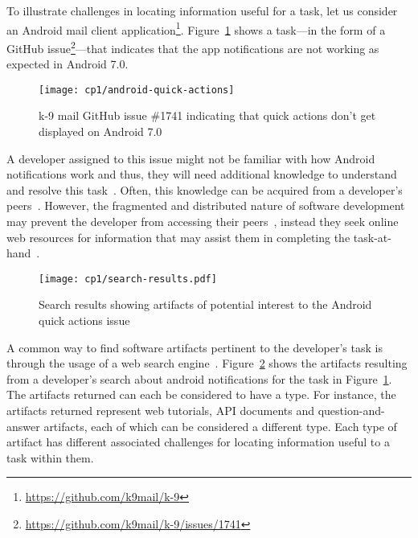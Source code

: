  
 
 To illustrate challenges in locating information useful for a task, let us consider an  Android mail client application\footnote{\url{https://github.com/k9mail/k-9}}.
 Figure~\ref{fig:android-notifications-task} shows a task---in the form of a GitHub issue\footnote{\url{https://github.com/k9mail/k-9/issues/1741}}---that indicates that the app notifications 
 are not working as expected in Android 7.0. 
 
 \medskip
 \begin{figure}[h!]
     \centering
     \texttt{[image: cp1/android-quick-actions]}
     \caption{k-9 mail GitHub issue \#1741 indicating that quick actions don't get displayed on Android 7.0}
     \label{fig:android-notifications-task}
 \end{figure}
 
 
 \medskip
 A developer assigned to this issue might not be familiar with how Android notifications work and thus, they will need additional knowledge to understand and resolve this task~\cite{ko2007, Li2013, sillito2006}. 
 Often, this knowledge can be acquired from a developer's peers~\cite{singer2011}. 
 However, the fragmented and distributed nature of software development  
 may prevent the developer from accessing their peers~\cite{ko2007},
 instead they seek online web resources for information 
 that may assist them in completing the task-at-hand~\cite{Xia2017, rao2020}.
 
 
 
 
 
 \begin{figure}
     \centering
     \texttt{[image: cp1/search-results.pdf]}
     \caption{Search results showing artifacts of potential interest to the Android quick actions issue}
     \label{fig:android-search-results}
 \end{figure}
 
 
 
A common way to find software artifacts
pertinent to the developer's task
is through the usage of a web search engine~\cite{Brandt2009a, Li2013}.
Figure~\ref{fig:android-search-results}
shows the artifacts resulting from a developer's search 
about android notifications for the task in Figure~\ref{fig:android-notifications-task}.
The artifacts returned can each be considered to have a type. For instance,
the artifacts returned represent web tutorials, API documents and question-and-answer
artifacts, each of which can be considered a different type.
Each type of artifact has different associated challenges for locating 
information useful to a task within them.



